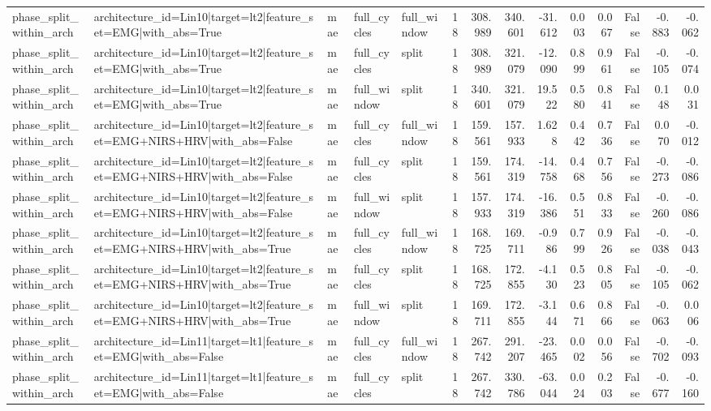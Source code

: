 \begin{table}
\begin{tabular}{lllllrrrrrrrrr}
phase_split_within_arch & architecture_id=Lin10|target=lt2|feature_set=EMG|with_abs=True & mae & full_cycles & full_window & 18 & 308.989 & 340.601 & -31.612 & 0.003 & 0.067 & False & -0.883 & -0.062 \\
phase_split_within_arch & architecture_id=Lin10|target=lt2|feature_set=EMG|with_abs=True & mae & full_cycles & split & 18 & 308.989 & 321.079 & -12.090 & 0.899 & 0.961 & False & -0.105 & -0.074 \\
phase_split_within_arch & architecture_id=Lin10|target=lt2|feature_set=EMG|with_abs=True & mae & full_window & split & 18 & 340.601 & 321.079 & 19.522 & 0.580 & 0.841 & False & 0.148 & 0.031 \\
phase_split_within_arch & architecture_id=Lin10|target=lt2|feature_set=EMG+NIRS+HRV|with_abs=False & mae & full_cycles & full_window & 18 & 159.561 & 157.933 & 1.628 & 0.442 & 0.736 & False & 0.070 & -0.012 \\
phase_split_within_arch & architecture_id=Lin10|target=lt2|feature_set=EMG+NIRS+HRV|with_abs=False & mae & full_cycles & split & 18 & 159.561 & 174.319 & -14.758 & 0.468 & 0.756 & False & -0.273 & -0.086 \\
phase_split_within_arch & architecture_id=Lin10|target=lt2|feature_set=EMG+NIRS+HRV|with_abs=False & mae & full_window & split & 18 & 157.933 & 174.319 & -16.386 & 0.551 & 0.833 & False & -0.260 & -0.086 \\
phase_split_within_arch & architecture_id=Lin10|target=lt2|feature_set=EMG+NIRS+HRV|with_abs=True & mae & full_cycles & full_window & 18 & 168.725 & 169.711 & -0.986 & 0.799 & 0.926 & False & -0.038 & -0.043 \\
phase_split_within_arch & architecture_id=Lin10|target=lt2|feature_set=EMG+NIRS+HRV|with_abs=True & mae & full_cycles & split & 18 & 168.725 & 172.855 & -4.130 & 0.523 & 0.805 & False & -0.105 & -0.062 \\
phase_split_within_arch & architecture_id=Lin10|target=lt2|feature_set=EMG+NIRS+HRV|with_abs=True & mae & full_window & split & 18 & 169.711 & 172.855 & -3.144 & 0.671 & 0.866 & False & -0.063 & 0.006 \\
phase_split_within_arch & architecture_id=Lin11|target=lt1|feature_set=EMG|with_abs=False & mae & full_cycles & full_window & 18 & 267.742 & 291.207 & -23.465 & 0.002 & 0.056 & False & -0.702 & -0.093 \\
phase_split_within_arch & architecture_id=Lin11|target=lt1|feature_set=EMG|with_abs=False & mae & full_cycles & split & 18 & 267.742 & 330.786 & -63.044 & 0.024 & 0.203 & False & -0.677 & -0.160 \\

\end{tabular}
\end{table}
